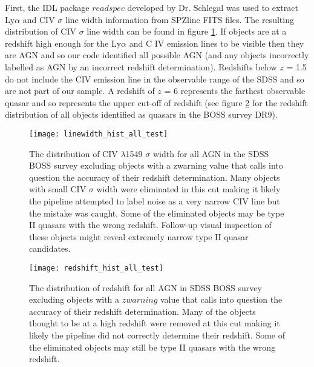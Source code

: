 \documentclass[preprint]{aastex}
\begin{document}
First, the IDL package $readspec$ developed by Dr. Schlegal was used to extract  Ly$\alpha$ and CIV $\sigma$ line width information from SPZline FITS files.  The resulting distribution of CIV $\sigma$ line width can be found in figure \ref{fig:linewidth_hist_all}.  If objects are at a redshift high enough for the Ly$\alpha$ and C IV emission lines to be visible then they are AGN and so our code identified all possible AGN (and any objects incorrectly labelled as AGN by an incorrect redshift determination).  Redshifts below $z$ = 1.5 do not include the CIV emission line in the observable range of the SDSS  and so are not part of our sample.  A redshift of $z$ = 6 represents the farthest observable quasar and so represents the upper cut-off of redshift (see figure \ref{fig:redshift_hist_all} for the redshift distribution of all objects identified as quasars in the BOSS survey DR9). 

\begin{figure}
\begin{center}
\texttt{[image: linewidth\_hist\_all\_test]}
\end{center}
\caption{The distribution of CIV $\lambda$1549 $\sigma$ width for all AGN in the SDSS BOSS survey excluding objects with a zwarning value that calls into question the accuracy of their redshift determination.  Many objects with small CIV $\sigma$ width were eliminated in this cut making it likely the pipeline attempted to label noise as a very narrow CIV line but the mistake was caught.  Some of the eliminated objects may be type II quasars with the wrong redshift.  Follow-up visual inspection of these objects might reveal extremely narrow type II quasar candidates.}
\label{fig:linewidth_hist_all}
\end{figure}

\begin{figure}
\begin{center}
\texttt{[image: redshift\_hist\_all\_test]}
\end{center}
\caption{The distribution of redshift for all AGN in SDSS BOSS survey excluding objects with a $zwarning$ value that calls into question the accuracy of their redshift determination.  Many of the objects thought to be at a high redshift were removed at this cut making it likely the pipeline did not correctly determine their redshift.  Some of the eliminated objects may still be type II quasars with the wrong redshift.}
\label{fig:redshift_hist_all}
\end{figure}
\end{document}
